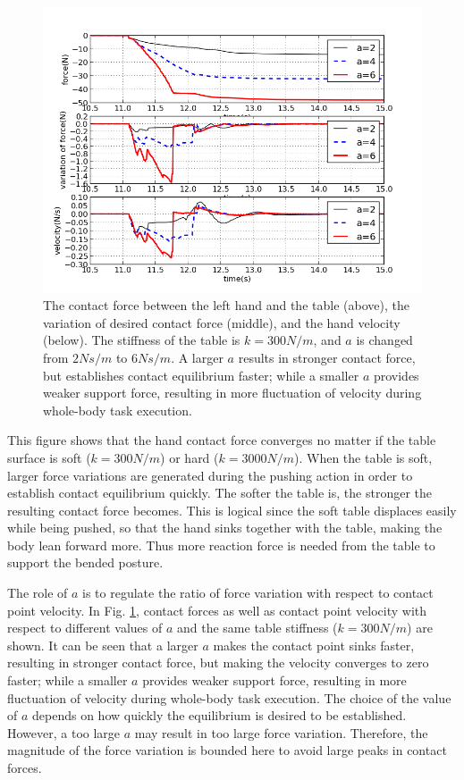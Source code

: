 \documentclass[letterpaper, 10 pt, conference]{ieeeconf}  %
\begin{document}
\begin{figure}[!t]
\centering
\includegraphics[width=\linewidth]{../figure/velocity_k300_d2-6.png}
\caption{The contact force between the left hand and the table (above), the variation of desired contact force (middle), and the hand velocity (below). The stiffness of the table is $k=300 N/m$, and $a$ is changed from $2 Ns/m$ to $6 Ns/m$. A larger $a$ results in stronger contact force, but establishes contact equilibrium faster; while a smaller $a$ provides weaker support force, resulting in more fluctuation of velocity during whole-body task execution.}
\label{reaching_velocity}
\end{figure}
This figure shows that the hand contact force converges no matter if the table surface is soft ($k=300 N/m$) or hard ($k=3000 N/m$). When the table is soft, larger force variations are generated during the pushing action in order to establish contact equilibrium quickly. The softer the table is, the stronger the resulting contact force becomes. This is logical since the soft table displaces easily while being pushed, so that the hand sinks together with the table, making the body lean forward more. Thus more reaction force is needed from the table to support the bended posture. 

The role of $a$ is to regulate the ratio of force variation with respect to contact point velocity. In Fig. \ref{reaching_velocity}, contact forces as well as contact point velocity with respect to different values of $a$ and the same table stiffness ($k=300 N/m$) are shown. It can be seen that a larger $a$ makes the contact point sinks faster, resulting in stronger contact force, but making the velocity converges to zero faster; while a smaller $a$ provides weaker support force, resulting in more fluctuation of velocity during whole-body task execution.
The choice of the value of $a$ depends on how quickly the equilibrium is desired to be established. However, a too large $a$ may result in too large force variation. Therefore, the magnitude of the force variation is bounded here to avoid large peaks in contact forces.
\end{document}

